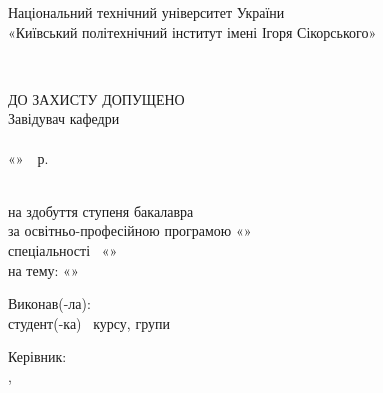 %
\thispagestyle{empty}

\begin{center}
  Національний технічний університет України\\
  «Київський політехнічний інститут імені Ігоря Сікорського»
\end{center}

\vspace{1em}
\noindent\facultyName\\
\departmentName

\vspace{2em}
\begin{flushright}
  \begin{minipage}{7.5cm}
    ДО ЗАХИСТУ ДОПУЩЕНО\\
    Завідувач кафедри\\
    \hrulefill\ \departmentHeadName\\
    «\hrulefill»\hrulefill~\thesisYear~р.
  \end{minipage}
\end{flushright}

\vspace{2em}
\begin{center}
  \workType\\
  на здобуття ступеня бакалавра\\
  за освітньо-професійною програмою «\programmeName»\\
  спеціальності \specialtyCode~«\specialtyName»\\
  на тему: «\thesisTitle»
\end{center}

\vspace{2em}
\noindent Виконав(-ла):\\
студент(-ка) \authorCourse~курсу, групи \authorGroup\\
\authorFullName \hfill \hrulefill

\medskip
\noindent Керівник:\\
\supervisorRegalia,\\
\supervisorFullName \hfill \hrulefill


